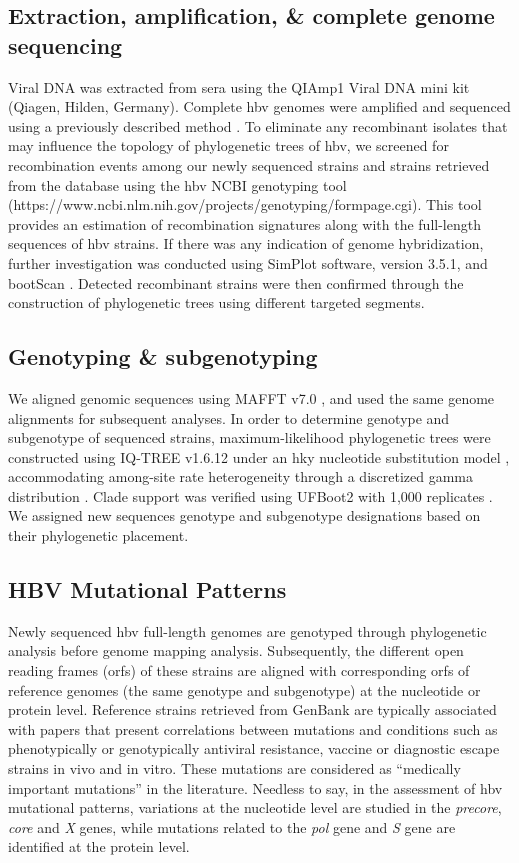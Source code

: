 \subsection{Extraction, amplification, \& complete genome sequencing}
Viral DNA was extracted from sera using the QIAmp1 Viral DNA mini kit (Qiagen, Hilden, Germany).
Complete \gls{hbv} genomes were amplified and sequenced using a previously described method \citep{pourkarim2011molecular,pourkarim2009phylogenetic}.
To eliminate any recombinant isolates that may influence the topology of phylogenetic trees of \gls{hbv}, we screened for recombination events among our newly sequenced strains and strains retrieved from the database using the \gls{hbv} NCBI genotyping tool (https://www.ncbi.nlm.nih.gov/projects/genotyping/formpage.cgi).
This tool provides an estimation of recombination signatures along with the full-length sequences of \gls{hbv} strains.
If there was any indication of genome hybridization, further investigation was conducted using SimPlot software, version 3.5.1, and bootScan \citep{lole1999full-length}.
Detected recombinant strains were then confirmed through the construction of phylogenetic trees using different targeted segments.

\subsection{Genotyping \& subgenotyping}
We aligned genomic sequences using MAFFT v7.0 \citep{katoh2013mafft}, and used the same genome alignments for subsequent analyses.
In order to determine genotype and subgenotype of sequenced strains, maximum-likelihood phylogenetic trees were constructed using IQ-TREE v1.6.12 \citep{nguyen2015iq} under an \gls{hky} nucleotide substitution model \citep{hasegawa1985dating}, accommodating among-site rate heterogeneity through a discretized gamma distribution \citep{yang1994maximum}.
Clade support was verified using UFBoot2 with 1,000 replicates \citep{hoang2018ufboot2}.
We assigned new sequences genotype and subgenotype designations based on their phylogenetic placement.

\subsection{HBV Mutational Patterns}
Newly sequenced \gls{hbv} full-length genomes are genotyped through phylogenetic analysis before genome mapping analysis.
Subsequently, the different open reading frames (\gls{orf}s) of these strains are aligned with corresponding \gls{orf}s of reference genomes (the same genotype and subgenotype) at the nucleotide or protein level.
Reference strains retrieved from GenBank are typically associated with papers that present correlations between mutations and conditions such as phenotypically or genotypically antiviral resistance, vaccine or diagnostic escape strains in vivo and in vitro.
These mutations are considered as ``medically important mutations'' in the literature.
Needless to say, in the assessment of \gls{hbv} mutational patterns, variations at the nucleotide level are studied in the \textit{precore}, \textit{core} and \textit{X} genes, while mutations related to the \textit{pol} gene and \textit{S} gene are identified at the protein level.

